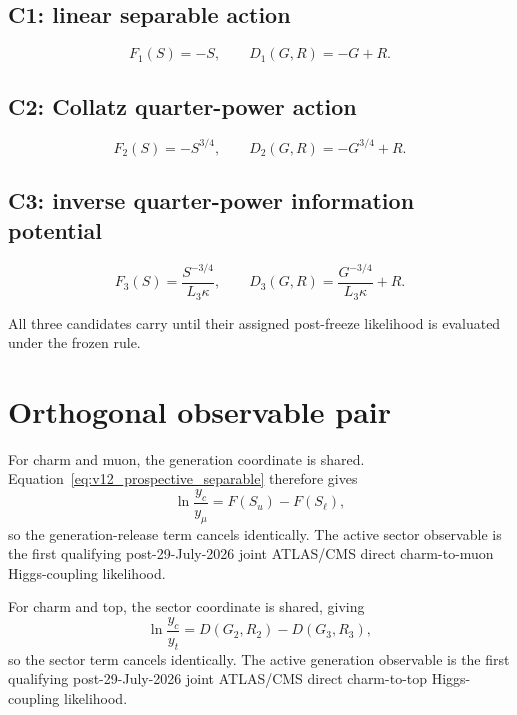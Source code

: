 \subsection{C1: linear separable action}
\begin{equation}
F_1(S)=-S,
\qquad
D_1(G,R)=-G+R.
\end{equation}

\subsection{C2: Collatz quarter-power action}
\begin{equation}
F_2(S)=-S^{3/4},
\qquad
D_2(G,R)=-G^{3/4}+R.
\end{equation}

\subsection{C3: inverse quarter-power information potential}
\begin{equation}
F_3(S)=\frac{S^{-3/4}}{L_3\kappa},
\qquad
D_3(G,R)=\frac{G^{-3/4}}{L_3\kappa}+R.
\end{equation}

All three candidates carry
until their assigned post-freeze likelihood is evaluated under the frozen rule.

\section{Orthogonal observable pair}

For charm and muon, the generation coordinate is shared. Equation~\eqref{eq:v12_prospective_separable} therefore gives
\begin{equation}
\boxed{
\ln\frac{y_c}{y_\mu}=F(S_u)-F(S_\ell),
}
\label{eq:v12_yc_ymu}
\end{equation}
so the generation-release term cancels identically. The active sector observable is the first qualifying post-29-July-2026 joint ATLAS/CMS direct charm-to-muon Higgs-coupling likelihood.

For charm and top, the sector coordinate is shared, giving
\begin{equation}
\boxed{
\ln\frac{y_c}{y_t}
=D(G_2,R_2)-D(G_3,R_3),
}
\label{eq:v12_yc_yt}
\end{equation}
so the sector term cancels identically. The active generation observable is the first qualifying post-29-July-2026 joint ATLAS/CMS direct charm-to-top Higgs-coupling likelihood.

